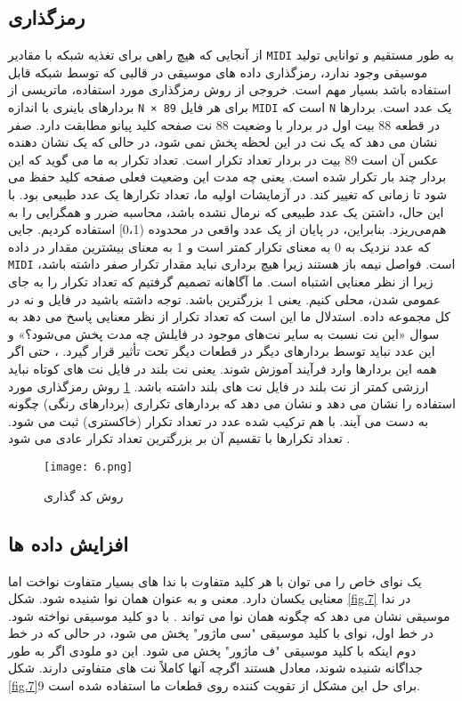 \subsection{رمزگذاری}
از آنجایی که هیچ راهی برای تغذیه شبکه با مقادیر 
\verb;MIDI;
به طور مستقیم و توانایی تولید موسیقی وجود ندارد،
رمزگذاری داده های موسیقی در قالبی که توسط شبکه قابل استفاده باشد بسیار مهم است. خروجی از
روش رمزگذاری مورد استفاده، ماتریسی از بردارهای باینری با اندازه 
\verb;N × 89;
برای هر فایل 
\verb;MIDI;
است که
\verb;N; 
یک عدد است. 
بردارها در قطعه 88 بیت اول در بردار با وضعیت 88 نت صفحه کلید پیانو مطابقت دارد.
صفر نشان می دهد که یک نت در این لحظه پخش نمی شود، در حالی که یک نشان دهنده عکس آن است
89  بیت در بردار تعداد تکرار است. تعداد تکرار به ما می گوید که این بردار چند بار تکرار شده است. 
یعنی چه مدت این وضعیت فعلی صفحه کلید حفظ می شود تا زمانی که تغییر کند. در آزمایشات اولیه ما،
تعداد تکرارها یک عدد طبیعی بود. با این حال، داشتن یک عدد طبیعی که نرمال نشده باشد، 
محاسبه ضرر و همگرایی را به هم‌می‌ریزد. بنابراین، در پایان از یک عدد واقعی در محدوده (0،1] استفاده کردیم. 
جایی که عدد نزدیک به 0 به معنای تکرار کمتر است و 1 به معنای بیشترین مقدار در داده 
\verb;MIDI;
است. 
فواصل نیمه باز هستند زیرا هیچ برداری نباید مقدار تکرار صفر داشته باشد، زیرا از نظر معنایی اشتباه است. 
ما آگاهانه تصمیم گرفتیم که تعداد تکرار را به جای عمومی شدن، محلی کنیم.  یعنی 1 بزرگترین باشد.
توجه داشته باشید در فایل و نه در کل مجموعه داده. استدلال ما این است که تعداد تکرار از نظر معنایی پاسخ می دهد به سوال 
«این نت نسبت به سایر نت‌های موجود در فایلش چه مدت پخش می‌شود؟» و این عدد نباید توسط بردارهای دیگر در قطعات دیگر تحت تأثیر قرار گیرد.
، حتی اگر همه این بردارها وارد فرآیند آموزش شوند. یعنی 
نت بلند در فایل نت های کوتاه نباید ارزشی کمتر از نت بلند در فایل نت های بلند داشته باشد. 
\cref{fig.5}
روش رمزگذاری مورد استفاده را نشان می دهد و نشان می دهد که بردارهای تکراری (بردارهای رنگی) چگونه به دست می آیند. 
با هم ترکیب شده عدد در تعداد تکرار (خاکستری) ثبت می شود.  تعداد تکرارها با تقسیم آن بر بزرگترین تعداد تکرار عادی می شود
.
\begin{figure}[!h]
\texttt{[image: 6.png]}
\caption{روش کد گذاری}\label{fig.5}
\end{figure}
\subsection{افزایش داده ها}
یک نوای خاص را می توان با هر کلید متفاوت با ندا های بسیار متفاوت نواخت اما معنایی یکسان دارد. 
معنی و به عنوان همان نوا شنیده شود. شکل 
\cref{fig.7}
در ندا موسیقی نشان می دهد که چگونه همان نوا می تواند .
با دو کلید موسیقی نواخته شود. در خط اول، نوای با کلید موسیقی "سی ماژور" پخش می شود، در حالی که در خط
دوم اینکه با کلید موسیقی "ف ماژور" پخش می شود. این دو ملودی اگر به طور جداگانه شنیده شوند، معادل هستند
اگرچه آنها کاملاً نت های متفاوتی دارند.  شکل 
\cref{fig.7}9
برای حل این مشکل از تقویت کننده روی قطعات ما استفاده شده است. 

